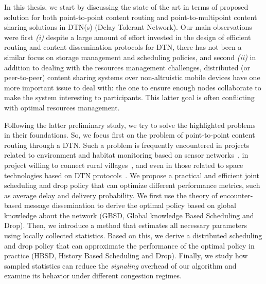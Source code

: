 \documentclass[a4paper,11pt,twoside]{ThesisStyle}
\begin{document}
In this thesis, we start by discussing the state of the art in terms of proposed solution for both point-to-point content routing and point-to-multipoint content sharing solutions in DTN(s) (Delay Tolerant Network). Our main observations were first \emph{(i)} despite a large amount of effort invested in the design of efficient routing and content dissemination protocols for DTN, there has not been a similar focus on storage management and scheduling policies, and second \emph{(ii)} in addition to dealing with the resources management challenges, distributed (or peer-to-peer) content sharing systems over non-altruistic mobile devices have one more important issue to deal with: the one to ensure enough nodes collaborate to make the system interesting to participants. This latter goal is often conflicting with optimal resources management. 

Following the latter preliminary study, we try to solve the highlighted problems in their foundations. So, we focus first on the problem of point-to-point content routing through a DTN. Such a problem is frequently encountered in projects related to environment and habitat monitoring based on sensor networks~\cite{MOMO, ARNETMINER}, in project willing to connect rural villages~\cite{ResiliNets, UMassDieselNet, KIOSKNET, BYTEWALLA, TIER}, and even in those related to space technologies based on DTN protocols~\cite{BioServe, Saratoga}. We propose a practical and efficient joint scheduling and drop policy that can optimize different performance metrics, such as average delay and delivery probability. We first use the theory of encounter-based message dissemination to derive the optimal policy based on global knowledge about the network (GBSD, Global knowledge Based Scheduling and Drop). Then, we introduce a method that estimates all necessary parameters using locally collected statistics. Based on this, we derive a distributed scheduling and drop policy that can approximate the performance of the optimal policy in practice (HBSD, History Based Scheduling and Drop). Finally, we study how sampled statistics can reduce the \textit{signaling} overhead of our algorithm and examine its behavior under different congestion regimes. 
\end{document}
